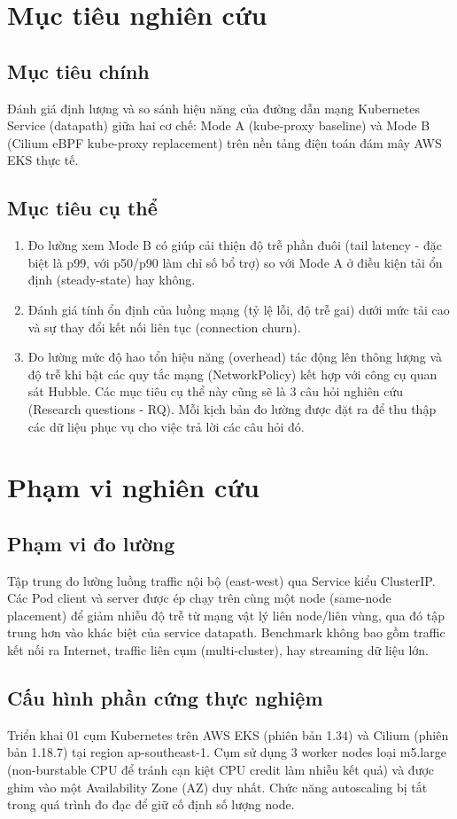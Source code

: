 \section{Mục tiêu nghiên cứu} %
\subsection{Mục tiêu chính}
Đánh giá định lượng và so sánh hiệu năng của đường dẫn mạng Kubernetes Service (datapath) giữa hai cơ chế: Mode A (kube-proxy baseline) và Mode B 
(Cilium eBPF kube-proxy replacement) trên nền tảng điện toán đám mây AWS EKS thực tế.

\subsection{Mục tiêu cụ thể}
\begin{enumerate}
\item Đo lường xem Mode B có giúp cải thiện độ trễ phần đuôi (tail latency - đặc biệt là p99, với p50/p90 làm chỉ số bổ trợ) so với Mode A ở điều kiện tải ổn định (steady-state) hay không.
\item Đánh giá tính ổn định của luồng mạng (tỷ lệ lỗi, độ trễ gai) dưới mức tải cao và sự thay đổi kết nối liên tục (connection churn).
\item Đo lường mức độ hao tổn hiệu năng (overhead) tác động lên thông lượng và độ trễ khi bật các quy tắc mạng (NetworkPolicy) kết hợp với công cụ quan sát Hubble.
Các mục tiêu cụ thể này cũng sẽ là 3 câu hỏi nghiên cứu (Research questions - RQ). Mỗi kịch bản đo lường được đặt ra để thu thập các dữ liệu phục vụ cho việc trả lời các câu hỏi đó.
\end{enumerate}
\section{Phạm vi nghiên cứu} %
\subsection{Phạm vi đo lường} %
Tập trung đo lường luồng traffic nội bộ (east-west) qua Service kiểu ClusterIP. Các Pod client và server được ép chạy trên cùng một node (same-node placement) 
để giảm nhiễu độ trễ từ mạng vật lý liên node/liên vùng, qua đó tập trung hơn vào khác biệt của service datapath. Benchmark không bao gồm traffic kết nối ra Internet, 
traffic liên cụm (multi-cluster), hay streaming dữ liệu lớn.
\subsection{Cấu hình phần cứng thực nghiệm}
Triển khai 01 cụm Kubernetes trên AWS EKS (phiên bản 1.34) và Cilium (phiên bản 1.18.7) tại region ap-southeast-1. Cụm sử dụng 3 worker nodes loại m5.large 
(non-burstable CPU để tránh cạn kiệt CPU credit làm nhiễu kết quả) và được ghim vào một Availability Zone (AZ) duy nhất. Chức năng autoscaling bị tắt 
trong quá trình đo đạc để giữ cố định số lượng node.
